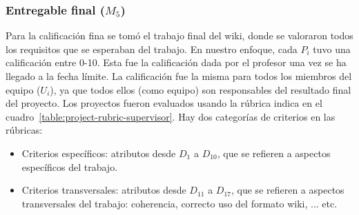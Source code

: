 \subsubsection{Entregable final ($M_5$)}

Para la calificación fina se tomó el trabajo final del wiki, donde se valoraron todos los requisitos que se esperaban del trabajo. En nuestro enfoque, cada $P_i$ tuvo una calificación entre 0-10. Esta fue la calificación dada por el profesor una vez se ha llegado a la fecha límite. La calificación fue la misma para todos los miembros del equipo ($U_i$), ya que todos ellos (como equipo) son responsables del resultado final del proyecto. Los proyectos fueron evaluados usando la rúbrica indica en el cuadro~\ref{table:project-rubric-supervisor}. Hay dos categorías de criterios en las rúbricas:

\begin{itemize}
\item Criterios específicos: atributos desde $D_1$ a  $D_{10}$, que se refieren a aspectos específicos del trabajo. 
\item Criterios transversales: atributos desde $D_{11}$ a  $D_{17}$, que se refieren a aspectos transversales del trabajo: coherencia, correcto uso del formato wiki, ... etc.
\end{itemize}

